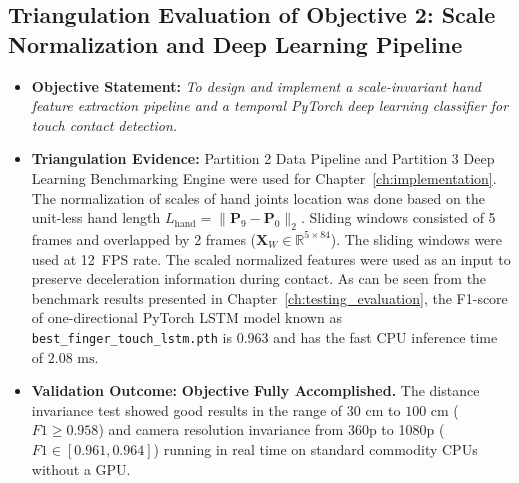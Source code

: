 \subsection{Triangulation Evaluation of Objective 2: Scale Normalization and Deep Learning Pipeline}
\label{subsec:concl_obj2}
\begin{itemize}
    \item \textbf{Objective Statement:} \emph{To design and implement a scale-invariant hand feature extraction pipeline and a temporal PyTorch deep learning classifier for touch contact detection.}
    \item \textbf{Triangulation Evidence:} Partition 2 Data Pipeline and Partition 3 Deep Learning Benchmarking Engine were used for Chapter~\ref{ch:implementation}. The normalization of scales of hand joints location was done based on the unit-less hand length $L_{\text{hand}} = \|\mathbf{P}_9 - \mathbf{P}_0\|_2$. Sliding windows consisted of 5 frames and overlapped by 2 frames ($\mathbf{X}_W \in \mathbb{R}^{5 \times 84}$). The sliding windows were used at 12~FPS rate. The scaled normalized features were used as an input to preserve deceleration information during contact. As can be seen from the benchmark results presented in Chapter~\ref{ch:testing_evaluation}, the F1-score of one-directional PyTorch LSTM model known as \texttt{best\allowbreak\_finger\allowbreak\_touch\allowbreak\_lstm.pth} is $0.963$ and has the fast CPU inference time of $2.08\text{ ms}$.
    \item \textbf{Validation Outcome:} \textbf{Objective Fully Accomplished.} The distance invariance test showed good results in the range of $30\text{ cm}$ to $100\text{ cm}$ ($F1 \ge 0.958$) and camera resolution invariance from 360p to 1080p ($F1 \in [0.961, 0.964]$) running in real time on standard commodity CPUs without a GPU.
\end{itemize}

